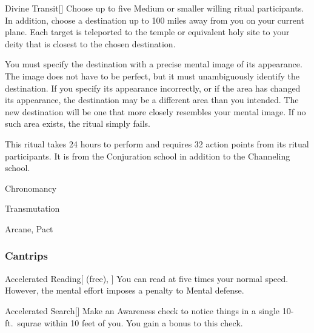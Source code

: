 \lowercase{\hypertarget{spell:Divine Transit}{}}\label{spell:Divine Transit}
\begin{freeability}[\nth{4}]{\hypertarget{spell:Divine Transit}{Divine Transit}}[]
Choose up to five Medium or smaller willing ritual participants.
In addition, choose a destination up to 100 miles away from you on your current plane.
Each target is teleported to the temple or equivalent holy site to your deity that is closest to the chosen destination.

You must specify the destination with a precise mental image of its appearance.
The image does not have to be perfect, but it must unambiguously identify the destination.
If you specify its appearance incorrectly, or if the area has changed its appearance, the destination may be a different area than you intended.
The new destination will be one that more closely resembles your mental image.
If no such area exists, the ritual simply fails.

This ritual takes 24 hours to perform and requires 32 action points from its ritual participants.
It is from the Conjuration school in addition to the Channeling school.
\end{freeability}
\vspace{0.25em}


\newpage
\begin{spellsection}{Chronomancy}

\begin{spellheader}
\end{spellheader}


 Transmutation

 Arcane, Pact

\subsubsection{Cantrips}


\begin{apability}{Accelerated Reading}[ (free), ]
You can read at five times your normal speed.
However, the mental effort imposes a  penalty to Mental defense.
\end{apability}


\begin{apability}{Accelerated Search}[]
Make an Awareness check to notice things in a single 10-ft.\ squrae within 10 feet of you.
You gain a  bonus to this check.
\end{apability}

\end{spellsection}


